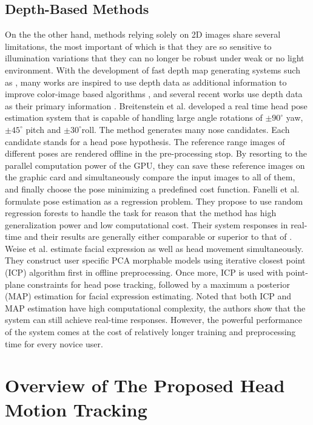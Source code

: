 \subsection{Depth-Based Methods}
On the the other hand, methods relying solely on 2D images share several limitations, the most important of which is that they are so sensitive to illumination variations that they can no longer be robust under weak or no light environment. With the development of fast depth map generating systems such as \cite{Ref12}, many works are inspired to use depth data as additional information to improve color-image based algorithms \cite{Ref1,Ref2,Ref20}, and several recent works use depth data as their primary information \cite{Ref3,Ref9,Ref16,Ref19}. Breitenstein et al. \cite{Ref3} developed a real time head pose estimation system that is capable of handling large angle rotations of $\pm 90^{\circ}$ yaw, $\pm 45^{\circ}$ pitch and $\pm 30^{\circ}$roll. The method generates many nose candidates. Each candidate  stands for a head pose hypothesis. The reference range images of different poses are rendered offline in the pre-processing stop. By resorting to the parallel computation power of the GPU, they can save these reference images on the graphic card and simultaneously compare the input images to all of them, and finally choose the pose minimizing a predefined cost function. Fanelli et al. \cite{Ref16} formulate pose estimation as a regression problem. They propose to use random regression forests to handle the task for reason that the method has high generalization power and low computational cost. Their system responses in real-time and their results are generally either comparable or superior to that of \cite{Ref3}. Weise et al. \cite{Ref19} estimate facial expression as well as head movement simultaneously. They construct user specific PCA morphable models using iterative closest point (ICP) algorithm first in offline preprocessing. Once more, ICP is used with point-plane constraints for head pose tracking, followed by a maximum a posterior (MAP) estimation for facial expression estimating. Noted that both ICP and MAP estimation have high computational complexity, the authors show that the system can still achieve real-time responses. However, the powerful performance of the system comes at the cost of relatively longer training and preprocessing time for every novice user.

\section{Overview of The Proposed Head Motion Tracking}

